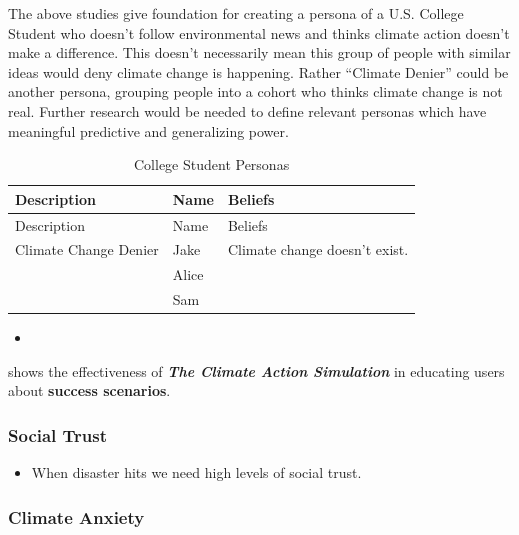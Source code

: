 \documentclass[
  letterpaper,
  DIV=11,
  numbers=noendperiod]{scrartcl}
\providecommand{\tightlist}{%
  \setlength{\itemsep}{0pt}\setlength{\parskip}{0pt}}\usepackage{longtable,booktabs,array}
\begin{document}
The above studies give foundation for creating a persona of a U.S.
College Student who doesn't follow environmental news and thinks climate
action doesn't make a difference. This doesn't necessarily mean this
group of people with similar ideas would deny climate change is
happening. Rather ``Climate Denier'' could be another persona, grouping
people into a cohort who thinks climate change is not real. Further
research would be needed to define relevant personas which have
meaningful predictive and generalizing power.

\begin{longtable}[]{@{}lll@{}}
\caption{College Student Personas}\tabularnewline
\toprule\noalign{}
Description & Name & Beliefs \\
\midrule\noalign{}
\endfirsthead
\toprule\noalign{}
Description & Name & Beliefs \\
\midrule\noalign{}
\endhead
\bottomrule\noalign{}
\endlastfoot
Climate Change Denier & Jake & Climate change doesn't exist. \\
& Alice & \\
& Sam & \\
\end{longtable}

\begin{itemize}
\tightlist
\item
  \citet{crabbRantTerriblePersonas2023}
\end{itemize}

\citet{RooneyVargaClimateActionSimulation2019} shows the effectiveness
of \textbf{\emph{The Climate Action Simulation}} in educating users
about \textbf{success scenarios}.

\subsubsection{Social Trust}\label{social-trust}

\begin{itemize}
\tightlist
\item
  When disaster hits we need high levels of social trust.
\end{itemize}

\subsubsection{Climate Anxiety}\label{climate-anxiety}
\end{document}
